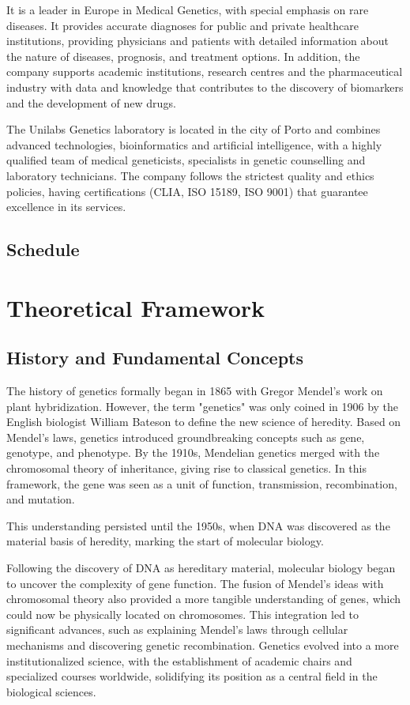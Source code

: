 It is a leader in Europe in Medical Genetics, with special emphasis on rare diseases. It provides accurate diagnoses for public and private healthcare institutions, providing physicians and patients with detailed information about the nature of diseases, prognosis, and treatment options. In addition, the company supports academic institutions, research centres and the pharmaceutical industry with data and knowledge that contributes to the discovery of biomarkers and the development of new drugs. 

The Unilabs Genetics laboratory is located in the city of Porto and combines advanced technologies, bioinformatics and artificial intelligence, with a highly qualified team of medical geneticists, specialists in genetic counselling and laboratory technicians. The company follows the strictest quality and ethics policies, having certifications (CLIA, ISO 15189, ISO 9001) that guarantee excellence in its services. \cite{unilabs_genetica}
\subsection{Schedule}

\section{Theoretical Framework}
\subsection{History and Fundamental Concepts}

The history of genetics formally began in 1865 with Gregor Mendel's work on plant hybridization. However, the term "genetics" was only coined in 1906 by the English biologist William Bateson to define the new science of heredity. Based on Mendel's laws, genetics introduced groundbreaking concepts such as gene, genotype, and phenotype. By the 1910s, Mendelian genetics merged with the chromosomal theory of inheritance, giving rise to classical genetics. In this framework, the gene was seen as a unit of function, transmission, recombination, and mutation.  

This understanding persisted until the 1950s, when DNA was discovered as the material basis of heredity, marking the start of molecular biology. \cite{Gayon2016}

Following the discovery of DNA as hereditary material, molecular biology began to uncover the complexity of gene function. The fusion of Mendel's ideas with chromosomal theory also provided a more tangible understanding of genes, which could now be physically located on chromosomes. This integration led to significant advances, such as explaining Mendel's laws through cellular mechanisms and discovering genetic recombination. Genetics evolved into a more institutionalized science, with the establishment of academic chairs and specialized courses worldwide, solidifying its position as a central field in the biological sciences. \cite{Gayon2016}

